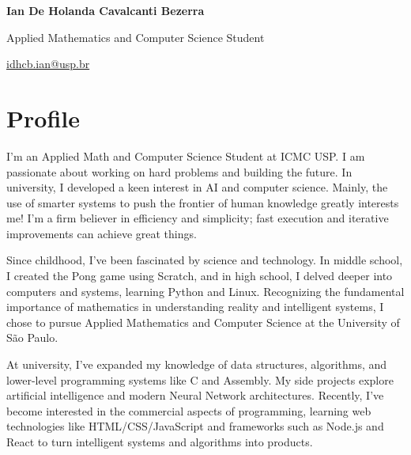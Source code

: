 \documentclass[a4paper,12pt]{article}
\begin{document}
\vspace*{-2cm}

\begin{center}
\Huge\textbf{Ian De Holanda Cavalcanti Bezerra}

\LARGE Applied Mathematics and Computer Science Student

\large\href{mailto:idhcb.ian@usp.br}{idhcb.ian@usp.br}
\end{center}

\section*{Profile}
\vspace{-0.5em}
\begin{multicols}{2}
\setlength{\columnsep}{0.4cm}
\setlength{\parindent}{0pt}
\setlength{\parskip}{0.15em}
\normalsize

I'm an Applied Math and Computer Science Student at ICMC USP. I am passionate about working on hard problems and building the future. In university, I developed a keen interest in AI and computer science. Mainly, the use of smarter systems to push the frontier of human knowledge greatly interests me! I'm a firm believer in efficiency and simplicity; fast execution and iterative improvements can achieve great things.

Since childhood, I've been fascinated by science and technology. In middle school, I created the Pong game using Scratch, and in high school, I delved deeper into computers and systems, learning Python and Linux. Recognizing the fundamental importance of mathematics in understanding reality and intelligent systems, I chose to pursue Applied Mathematics and Computer Science at the University of São Paulo.

At university, I've expanded my knowledge of data structures, algorithms, and lower-level programming systems like C and Assembly. My side projects explore artificial intelligence and modern Neural Network architectures. Recently, I've become interested in the commercial aspects of programming, learning web technologies like HTML/CSS/JavaScript and frameworks such as Node.js and React to turn intelligent systems and algorithms into products.
\end{multicols}
\vspace{-0.5em}
\end{document}
